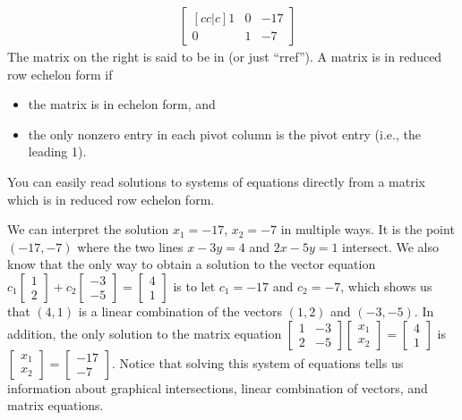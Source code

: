 {\begin{example}
$$\begin{array}{rr}
&
\begin{bmatrix}[cc|c] 1&0&-17\\0&1&-7
\end{bmatrix} 
\end{array}
$$
The matrix on the right is said to be in  (or just ``rref''). 
%
A matrix is in reduced row echelon form if 
\begin{itemize}
	\item the matrix is in echelon form, and 
	\item the only nonzero entry in each pivot column is the pivot entry (i.e., the leading 1).
\end{itemize}
 You can easily read solutions to systems of equations directly from a matrix which is in reduced row echelon form.

We can interpret the solution $x_1=-17$, $x_2=-7$ in multiple ways.  It is the point $(-17,-7)$ where the two lines $x-3y=4$ and $
2x-5y=1$ intersect.  We also know that the only way to obtain a solution to the vector equation 
$c_1
\begin{bmatrix}
1\\
2
\end{bmatrix}
+
c_2
\begin{bmatrix}
-3\\
-5
\end{bmatrix}
=
\begin{bmatrix}
4\\
1
\end{bmatrix}
$ is to let $c_1=-17$ and $c_2=-7$, which shows us that $(4,1)$ is a linear combination of the vectors $(1,2)$ and $(-3,-5)$.  In addition, the only solution to the matrix equation 
$\begin{bmatrix}1&-3\\ 2 &-5 \end{bmatrix}\begin{bmatrix}x_1\\ x_2\end{bmatrix}=\begin{bmatrix}4\\1\end{bmatrix}$ 
is 
$\begin{bmatrix}x_1\\x_2\end{bmatrix}=\begin{bmatrix}-17\\-7\end{bmatrix}$.   Notice that solving this system of equations tells us information about graphical intersections, linear combination of vectors, and matrix equations.
\end{example}


}
